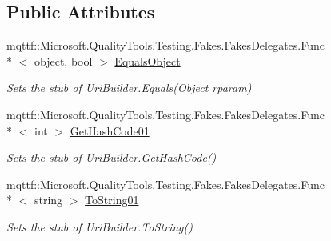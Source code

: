\subsection*{Public Attributes}
\begin{DoxyCompactItemize}
\item 
mqttf\-::\-Microsoft.\-Quality\-Tools.\-Testing.\-Fakes.\-Fakes\-Delegates.\-Func\\*
$<$ object, bool $>$ \hyperlink{class_system_1_1_fakes_1_1_stub_uri_builder_a7977b009d26a7dc9a16ab9d6bc264d37}{Equals\-Object}
\begin{DoxyCompactList}\small\item\em Sets the stub of Uri\-Builder.\-Equals(\-Object rparam)\end{DoxyCompactList}\item 
mqttf\-::\-Microsoft.\-Quality\-Tools.\-Testing.\-Fakes.\-Fakes\-Delegates.\-Func\\*
$<$ int $>$ \hyperlink{class_system_1_1_fakes_1_1_stub_uri_builder_a13fd9e4cf8c053b0d273ffcfb61d854a}{Get\-Hash\-Code01}
\begin{DoxyCompactList}\small\item\em Sets the stub of Uri\-Builder.\-Get\-Hash\-Code()\end{DoxyCompactList}\item 
mqttf\-::\-Microsoft.\-Quality\-Tools.\-Testing.\-Fakes.\-Fakes\-Delegates.\-Func\\*
$<$ string $>$ \hyperlink{class_system_1_1_fakes_1_1_stub_uri_builder_a1db80d6fe85ffca8042efe77e03ed41f}{To\-String01}
\begin{DoxyCompactList}\small\item\em Sets the stub of Uri\-Builder.\-To\-String()\end{DoxyCompactList}\end{DoxyCompactItemize}
